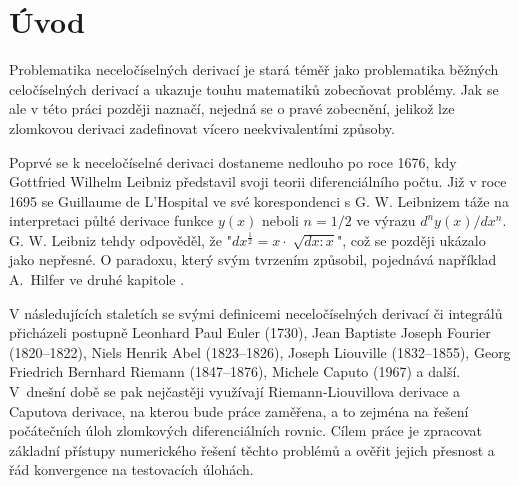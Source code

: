 \documentclass[a4paper,12pt,twoside]{article}
\theoremstyle{definition}
\theoremstyle{remark}
\numberwithin{equation}{section}
\numberwithin{table}{section}
\numberwithin{figure}{section}
\begin{document}
\newpage
\pagestyle{fancy}
\setlength{\headheight}{13.78807pt}
\renewcommand{\headrulewidth}{0.4pt}
\renewcommand{\sectionmark}[1]{\markboth{\thesection~  #1}{} }
\fancyhead[LO,RE]{\small\textit{\nouppercase{\leftmark}}}
\fancyhead[LE,RO]{\small\thepage}
\fancyfoot[LE,RO]{\empty}
\fancyfoot[CE,CO]{\empty}


\newpage
\tableofcontents
\newpage


\section{Úvod}

Problematika neceločíselných derivací je stará téměř jako problematika běžných celočíselných derivací a ukazuje touhu matematiků zobecňovat problémy. Jak se ale v této práci později naznačí, nejedná se o pravé zobecnění, jelikož lze zlomkovou derivaci zadefinovat vícero neekvivalentími způsoby. 

Poprvé se k neceločíselné derivaci dostaneme nedlouho po roce 1676, kdy Gottfried Wilhelm Leibniz představil svoji teorii diferenciálního počtu. Již v roce 1695 se Guillaume de L'Hospital ve své korespondenci s G. W. Leibnizem táže na interpretaci půlté derivace funkce $y\left(x\right)$ neboli  $n = 1/2$ ve výrazu ${d^{n}y\left(x\right)}/{dx^{n}}$. G. W. Leibniz tehdy odpověděl, že "$dx^{\frac{1}{2}} = x \cdot \sqrt[]{dx :x}$", což se později ukázalo jako nepřesné. O paradoxu, který svým tvrzením způsobil, pojednává například A.~Hilfer ve druhé kapitole \cite{LeibnitzFail}.

V následujících staletích se svými definicemi neceločíselných derivací či integrálů přicházeli postupně Leonhard Paul Euler (1730), Jean Baptiste Joseph Fourier (1820--1822), Niels Henrik Abel (1823--1826), Joseph Liouville (1832--1855), Georg Friedrich Bernhard Riemann  (1847--1876), Michele Caputo (1967)  a další. 
V~dnešní době se pak nejčastěji využívají Riemann-Liouvillova derivace a Caputova derivace, na kterou bude práce zaměřena, a to zejména na řešení počátečních úloh zlomkových diferenciálních rovnic. Cílem práce je zpracovat základní přístupy numerického řešení těchto problémů a ověřit jejich přesnost a řád konvergence na testovacích úlohách.
\end{document}
